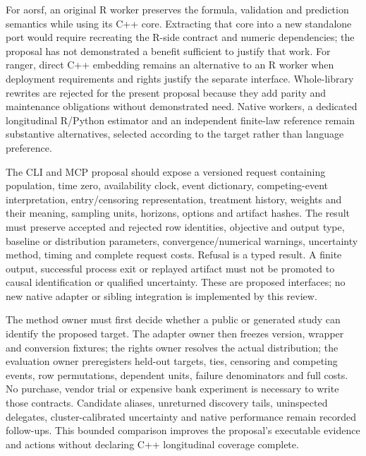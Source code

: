 For aorsf, an original R worker preserves the formula, validation and prediction
semantics while using its C++ core. Extracting that core into a new standalone
port would require recreating the R-side contract and numeric dependencies;
the proposal has not demonstrated a benefit sufficient to justify that work.
For ranger, direct C++ embedding remains an alternative to an R worker when
deployment requirements and rights justify the separate interface. Whole-library
rewrites are rejected for the present proposal because they add parity and
maintenance obligations without demonstrated need. Native workers, a dedicated
longitudinal R/Python estimator and an independent finite-law reference remain
substantive alternatives, selected according to the target rather than language
preference.\citep{exec24_longcxx_aorsf,exec24_longcxx_ranger}

The CLI and MCP proposal should expose a versioned request containing population,
time zero, availability clock, event dictionary, competing-event interpretation,
entry/censoring representation, treatment history, weights and their meaning,
sampling units, horizons, options and artifact hashes. The result must preserve
accepted and rejected row identities, objective and output type, baseline or
distribution parameters, convergence/numerical warnings, uncertainty method,
timing and complete request costs. Refusal is a typed result. A finite output,
successful process exit or replayed artifact must not be promoted to causal
identification or qualified uncertainty. These are proposed interfaces; no new
native adapter or sibling integration is implemented by this review.

The method owner must first decide whether a public or generated study can
identify the proposed target. The adapter owner then freezes version, wrapper
and conversion fixtures; the rights owner resolves the actual distribution;
the evaluation owner preregisters held-out targets, ties, censoring and competing
events, row permutations, dependent units, failure denominators and full costs.
No purchase, vendor trial or expensive bank experiment is necessary to write
those contracts. Candidate aliases, unreturned discovery tails, uninspected
delegates, cluster-calibrated uncertainty and native performance remain recorded
follow-ups. This bounded comparison improves the proposal's executable evidence
and actions without declaring C++ longitudinal coverage complete.
